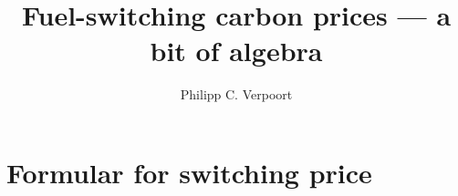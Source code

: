 \documentclass[%
 draft,
 aapm,
 mph,%
 amsmath,amssymb,
 reprint,%
]{revtex4-2}
\begin{document}

\title{Fuel-switching carbon prices — a bit of algebra} %



\author{Philipp C. Verpoort}





\maketitle %

\section{Formular for switching price}
\end{document}
